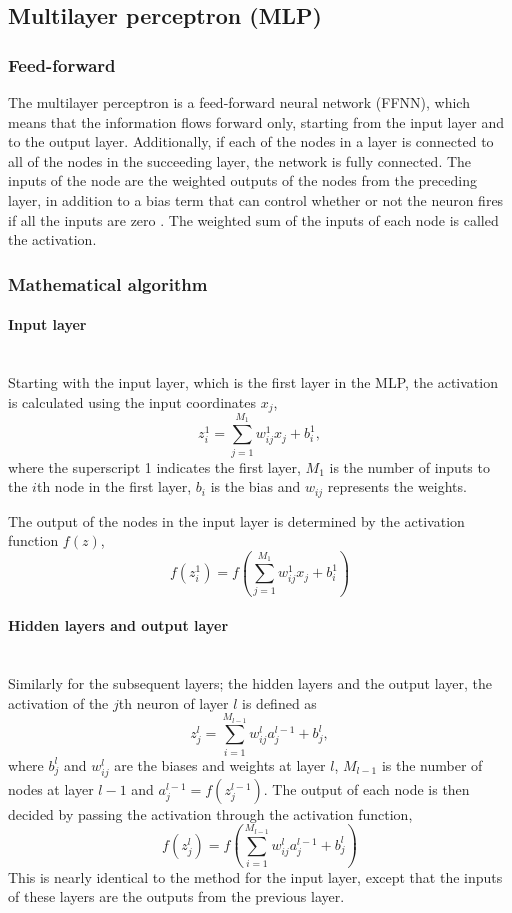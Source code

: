 \documentclass[a4paper, 11pt, twocolumn]{article}
\newcommand{\myparagraph}[1]{\paragraph{#1}\mbox{}\\}
\begin{document}
\subsection{Multilayer perceptron (MLP)}

\subsubsection{Feed-forward  }
The multilayer perceptron is a feed-forward neural network (FFNN), which means 
that the information flows forward only, starting from the input layer and to 
the output layer. Additionally, if each of the nodes in a layer is connected to 
all of the nodes in the succeeding layer, the network is fully connected. The 
inputs of the node are the weighted outputs of the nodes from the preceding 
layer, in addition to a bias term that can control whether or not the neuron 
fires if all the inputs are zero \cite{ML_algo}. The weighted sum of the inputs 
of each node is called the activation.
 
\subsubsection*{Mathematical algorithm} \myparagraph{Input layer}
Starting with the input layer, which is the first layer in the MLP, the 
activation is calculated using the input coordinates $x_j$, 
\begin{equation}
z_i^1 = \sum^{M_1}_{j=1}w_{ij}^1x_j + b_i^1,
\end{equation}
where the superscript 1 indicates the first layer, $M_1$ is the number of inputs 
to the $i$th node in the first layer, $b_i$ is the bias and $w_{ij}$ represents 
the weights.

The output of the nodes in the input layer is determined by the activation 
function $f(z)$,
\begin{equation}
f(z_i^1) = f \left( \sum^{M_1}_{j=1}w_{ij}^1x_j + b_i^1 \right)
\end{equation}
\myparagraph{Hidden layers and output layer}
Similarly for the subsequent layers; the hidden layers and the output layer, the 
activation of the $j$th neuron of layer $l$ is defined as
\begin{equation}
z_j^l = \sum_{i=1}^{M_{l-1}} w_{ij}^la_j^{l-1} + b_j^l,
\end{equation}
where $b_j^l$ and $w_{ij}^l$ are the biases and weights at layer $l$, ${M_{l-1}}$ 
is the number of nodes at layer $l-1$ and $a_j^{l-1}=f(z_j^{l-1}) $.
The output of each node is then decided by passing the activation through the 
activation function,
\begin{equation}
 f(z_j^l) =f \left(     \sum_{i=1}^{M_{l-1}} w_{ij}^la_j^{l-1} + b_j^l \right)
\end{equation}
This is nearly identical to the method for the input layer, except that the 
inputs of these layers are the outputs from the previous layer.
\end{document}
